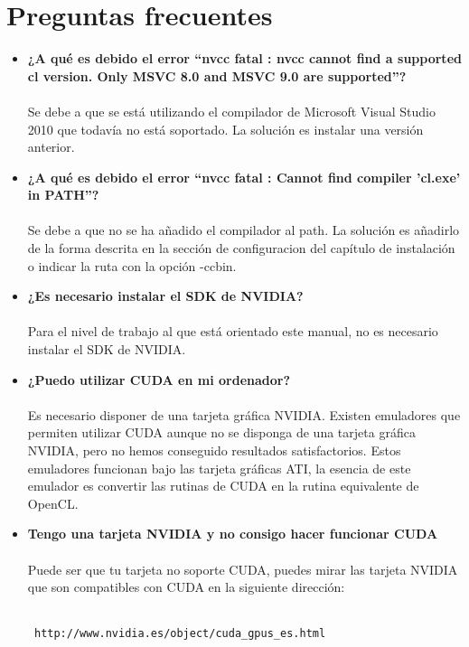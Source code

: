 \section{Preguntas frecuentes}
\begin{itemize}
 \item  \textbf{¿A qué es debido el error ``nvcc fatal   : nvcc cannot find a
  supported cl version. Only MSVC 8.0 and MSVC 9.0 are supported''?}\\\\
  Se debe a que se está utilizando el compilador de Microsoft Visual Studio 2010
  que todavía no está soportado. La solución es instalar una versión anterior.
 \item \textbf{¿A qué es debido el error ``nvcc fatal   : Cannot find compiler 'cl.exe' in PATH''?}\\\\
  Se debe a que no se ha añadido el compilador al path. La solución es añadirlo de la forma
  descrita en la sección de configuracion del capítulo de instalación o indicar la ruta con
  la opción -ccbin.
  \item \textbf{¿Es necesario instalar el SDK de NVIDIA?}\\\\
    Para el nivel de trabajo al que está orientado este manual, no es necesario instalar el SDK de NVIDIA.
  \item \textbf{¿Puedo utilizar CUDA en mi ordenador?}\\\\
  Es necesario disponer de una tarjeta gráfica NVIDIA. Existen emuladores que permiten utilizar CUDA aunque no se disponga de una tarjeta gráfica NVIDIA, pero no hemos conseguido resultados satisfactorios. Estos emuladores funcionan bajo las tarjeta gráficas ATI, la esencia de este emulador es convertir las rutinas de CUDA en la rutina equivalente de OpenCL.
 \item \textbf{Tengo una tarjeta NVIDIA y no consigo hacer funcionar CUDA}\\\\
Puede ser que tu tarjeta no soporte CUDA, puedes mirar las tarjeta NVIDIA que son compatibles con CUDA en la siguiente dirección: \\\\ \begin{verbatim} http://www.nvidia.es/object/cuda_gpus_es.html  \end{verbatim}
\end{itemize}

